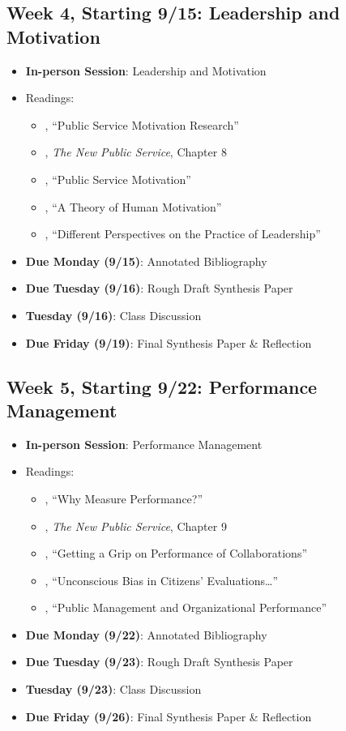 \documentclass[12pt]{article}     %
\begin{document}
\subsection*{Week 4, Starting 9/15: Leadership and Motivation}
\begin{itemize}
    \item \textbf{In-person Session}: Leadership and Motivation
    \item Readings:
        \begin{itemize}
            \item \citet{Christensen2017}, ``Public Service Motivation Research'' 
            \item \citet{Denhardt2015}, \emph{The New Public Service}, Chapter 8 
            \item \citet{Lachance2017}, ``Public Service Motivation'' 
            \item \citet{maslow1943}, ``A Theory of Human Motivation'' 
            \item \citet{Fairholm2004}, ``Different Perspectives on the Practice of Leadership'' 
        \end{itemize}
    \item \textbf{Due Monday (9/15)}: Annotated Bibliography
    \item \textbf{Due Tuesday (9/16)}: Rough Draft Synthesis Paper
    \item \textbf{Tuesday (9/16)}: Class Discussion
    \item \textbf{Due Friday (9/19)}: Final Synthesis Paper \& Reflection
\end{itemize}

\subsection*{Week 5, Starting 9/22: Performance Management}
\begin{itemize}
    \item \textbf{In-person Session}: Performance Management
    \item Readings:
        \begin{itemize}
            \item \citet{Behn2003}, ``Why Measure Performance?'' 
            \item \citet{Denhardt2015}, \emph{The New Public Service}, Chapter 9 
            \item \citet{douglas2021}, ``Getting a Grip on Performance of Collaborations'' 
            \item \citet{marvel2015}, ``Unconscious Bias in Citizens' Evaluations\dots'' 
            \item \citet{nicholson-crotty2004}, ``Public Management and Organizational Performance'' 
        \end{itemize}
    \item \textbf{Due Monday (9/22)}: Annotated Bibliography
    \item \textbf{Due Tuesday (9/23)}: Rough Draft Synthesis Paper
    \item \textbf{Tuesday (9/23)}: Class Discussion
    \item \textbf{Due Friday (9/26)}: Final Synthesis Paper \& Reflection
\end{itemize}
\end{document}
